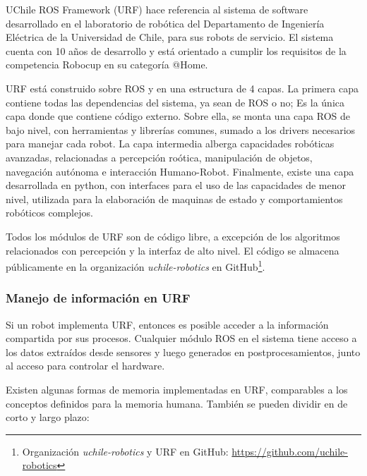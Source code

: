 UChile ROS Framework (URF) hace referencia al sistema de software desarrollado en el laboratorio de rob\'otica del Departamento de Ingenier\'ia El\'ectrica de la Universidad de Chile, para sus robots de servicio. El sistema cuenta con 10 a\~nos de desarrollo y est\'a orientado a cumplir los requisitos de la competencia Robocup en su categor\'ia @Home.

URF est\'a construido sobre ROS y en una estructura de 4 capas. La primera capa contiene todas las dependencias del sistema, ya sean de ROS o no; Es la \'unica capa donde que contiene c\'odigo externo. Sobre ella, se monta una capa ROS de bajo nivel, con herramientas y librer\'ias comunes, sumado a los drivers necesarios para manejar cada robot. La capa intermedia alberga capacidades rob\'oticas avanzadas, relacionadas a percepci\'on ro\'otica, manipulaci\'on de objetos, navegaci\'on aut\'onoma e interacci\'on Humano-Robot. Finalmente, existe una capa desarrollada en python, con interfaces para el uso de las capacidades de menor nivel, utilizada para la elaboraci\'on de maquinas de estado y comportamientos rob\'oticos complejos.


Todos los m\'odulos de URF son de c\'odigo libre, a excepci\'on de los algoritmos relacionados con percepci\'on y la interfaz de alto nivel. El c\'odigo se almacena p\'ublicamente en la organizaci\'on \textit{uchile-robotics} en GitHub\footnote{Organizaci\'on \textit{uchile-robotics} y URF en GitHub: \url{https://github.com/uchile-robotics}}.




\subsubsection{Manejo de informaci\'on en URF}

Si un robot implementa URF, entonces es posible acceder a la informaci\'on compartida por sus procesos. Cualquier m\'odulo ROS en el sistema tiene acceso a los datos extra\'idos desde sensores y luego generados en postprocesamientos, junto al acceso para controlar el hardware.

Existen algunas formas de memoria implementadas en URF, comparables a los conceptos definidos para la memoria humana. Tambi\'en se pueden dividir en de corto y largo plazo:

